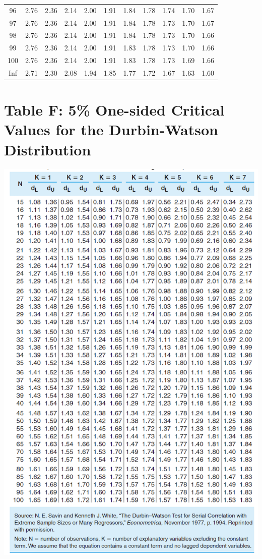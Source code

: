 \documentclass[
]{book}
\theoremstyle{definition}
\theoremstyle{definition}
\theoremstyle{definition}
\theoremstyle{definition}
\theoremstyle{remark}
\begin{document}
\begin{longtable}[]{@{}ccccccccccc@{}}
96 & 2.76 & 2.36 & 2.14 & 2.00 & 1.91 & 1.84 & 1.78 & 1.74 & 1.70 & 1.67 \\
97 & 2.76 & 2.36 & 2.14 & 2.00 & 1.91 & 1.84 & 1.78 & 1.73 & 1.70 & 1.67 \\
98 & 2.76 & 2.36 & 2.14 & 2.00 & 1.91 & 1.84 & 1.78 & 1.73 & 1.70 & 1.66 \\
99 & 2.76 & 2.36 & 2.14 & 2.00 & 1.91 & 1.83 & 1.78 & 1.73 & 1.70 & 1.66 \\
100 & 2.76 & 2.36 & 2.14 & 2.00 & 1.91 & 1.83 & 1.78 & 1.73 & 1.69 & 1.66 \\
Inf & 2.71 & 2.30 & 2.08 & 1.94 & 1.85 & 1.77 & 1.72 & 1.67 & 1.63 & 1.60 \\
\bottomrule()
\end{longtable}

\hypertarget{table-f-5-one-sided-critical-values-for-the-durbin-watson-distribution}{%
\section*{Table F: 5\% One-sided Critical Values for the Durbin-Watson Distribution}\label{table-f-5-one-sided-critical-values-for-the-durbin-watson-distribution}}

\includegraphics{images/durbin.png}

  
\end{document}
